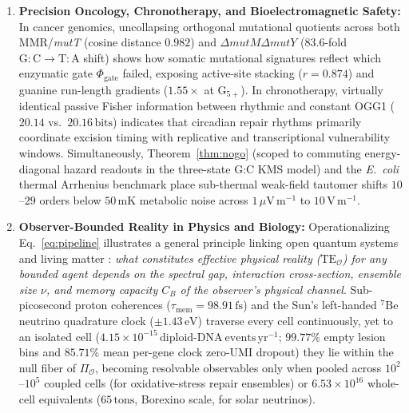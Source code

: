 \documentclass[10pt,letterpaper]{article}
\theoremstyle{plain}
\theoremstyle{definition}
\begin{document}
\begin{enumerate}[leftmargin=1.8em,itemsep=2pt]
    \item \textbf{Precision Oncology, Chronotherapy, and Bioelectromagnetic Safety:} In cancer genomics, uncollapsing orthogonal mutational quotients across both MMR/\emph{mutT} (cosine distance $0.982$) and $\Delta\textit{mutM}\Delta\textit{mutY}$ ($83.6$-fold $\mathrm{G{:}C \to T{:}A}$ shift) shows how somatic mutational signatures \cite{otlu2023celrep} reflect which enzymatic gate $\Phi_{\mathrm{gate}}$ failed, exposing active-site stacking ($r = 0.874$) and guanine run-length gradients ($1.55\times$ at $\mathrm{G}_{5+}$). In chronotherapy, virtually identical passive Fisher information between rhythmic and constant OGG1 ($20.14$ vs.\ $20.16\,\mathrm{bits}$) indicates that circadian repair rhythms primarily coordinate excision timing with replicative and transcriptional vulnerability windows. Simultaneously, Theorem~\ref{thm:nogo} (scoped to commuting energy-diagonal hazard readouts in the three-state G:C KMS model) and the \emph{E.\ coli} thermal Arrhenius benchmark \cite{chu2018bmcevol} place sub-thermal weak-field tautomer shifts $10$--$29$ orders below $50\,\mathrm{mK}$ metabolic noise across $1\,\mu\mathrm{V\,m^{-1}}$ to $10\,\mathrm{V\,m^{-1}}$.
    \item \textbf{Observer-Bounded Reality in Physics and Biology:} Operationalizing Eq.~\eqref{eq:pipeline} illustrates a general principle linking open quantum systems and living matter \cite{garcia2026observer,garcia2026memory,garcia2026quantumlike}: \emph{what constitutes effective physical reality ($\mathrm{TE}_{\mathcal{O}}$) for any bounded agent depends on the spectral gap, interaction cross-section, ensemble size $\nu$, and memory capacity $C_B$ of the observer's physical channel}. Sub-picosecond proton coherences ($\tau_{\mathrm{mem}} = 98.91\,\mathrm{fs}$) and the Sun's left-handed $^7\mathrm{Be}$ neutrino quadrature clock ($\pm 1.43\,\mathrm{eV}$) traverse every cell continuously, yet to an isolated cell ($4.15 \times 10^{-15}\,\mathrm{diploid\text{-}DNA\ events\,yr^{-1}}$; $99.77\%$ empty lesion bins and $85.71\%$ mean per-gene clock zero-UMI dropout) they lie within the null fiber of $\Pi_{\mathcal{O}}$, becoming resolvable observables only when pooled across $10^2$--$10^5$ coupled cells (for oxidative-stress repair ensembles) or $6.53 \times 10^{16}$ whole-cell equivalents ($65\,\mathrm{tons}$, Borexino scale, for solar neutrinos).
\end{enumerate}
\end{document}
